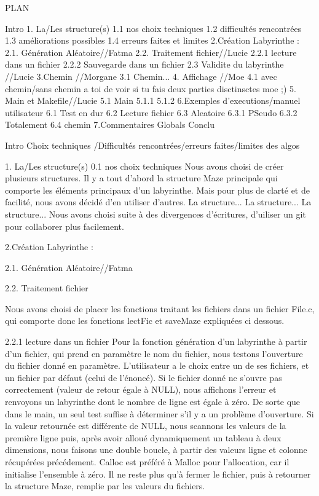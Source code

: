 PLAN

Intro
1. La/Les  structure(s)
  1.1 nos choix techniques
  1.2 difficultés rencontrées
  1.3 améliorations possibles
  1.4 erreurs faites et limites
2.Création Labyrinthe :
 2.1. Génération Aléatoire//Fatma
  2.2. Traitement fichier//Lucie
    2.2.1 lecture dans un fichier
    2.2.2 Sauvegarde dans un fichier
  2.3 Validite du labyrinthe //Lucie
3.Chemin //Morgane
  3.1 Chemin...
4. Affichage //Moe
  4.1 avec chemin/sans chemin a toi de voir si tu fais deux parties disctinsctes moe ;)
5. Main et Makefile//Lucie
  5.1 Main
    5.1.1
    5.1.2
6.Exemples d'executions/manuel utilisateur
  6.1 Test en dur
  6.2 Lecture fichier
  6.3 Aleatoire
    6.3.1 PSeudo
    6.3.2 Totalement
  6.4 chemin
7.Commentaires Globals
Conclu






Intro
Choix techniques /Difficultés rencontrées/erreurs faites/limites des algos


1. La/Les  structure(s)
0.1 nos choix techniques
  Nous avons choisi de créer plusieurs structures. Il y a tout d'abord la structure Maze principale qui comporte les éléments principaux d'un labyrinthe. Mais pour plus de clarté et de facilité, nous avons décidé d'en utiliser d'autres.
  La structure...
  La structure...
  La structure...
Nous avons choisi suite à des divergences d'écritures, d'uiliser un git pour collaborer plus facilement.


2.Création Labyrinthe :

2.1. Génération Aléatoire//Fatma

2.2. Traitement fichier

Nous avons choisi de placer les fonctions traitant les fichiers dans un fichier File.c, qui comporte donc les fonctions lectFic et saveMaze expliquées ci dessous.

2.2.1 lecture dans un fichier
Pour la fonction génération d'un labyrinthe à partir d'un fichier, qui prend en paramètre le nom du fichier, nous testons l'ouverture du fichier donné en paramètre. L'utilisateur a le choix entre un de ses fichiers, et un fichier par défaut (celui de l'énoncé). Si le fichier donné ne s'ouvre pas correctement (valeur de retour égale à NULL), nous affichons l'erreur et renvoyons un labyrinthe dont le nombre de ligne est égale à zéro. De sorte que dans le main, un seul test suffise à déterminer s'il y a un problème d'ouverture.
Si la valeur retournée est différente de NULL, nous scannons les valeurs de la première ligne puis, après avoir alloué dynamiquement un tableau à deux dimensions, nous faisons une double boucle, à partir des valeurs ligne et colonne récupérées précédement. Calloc est préféré à Malloc pour l'allocation, car il initialise l'ensemble à zéro. Il ne reste plus qu'à fermer le fichier, puis à retourner la structure Maze, remplie par les valeurs du fichiers.

